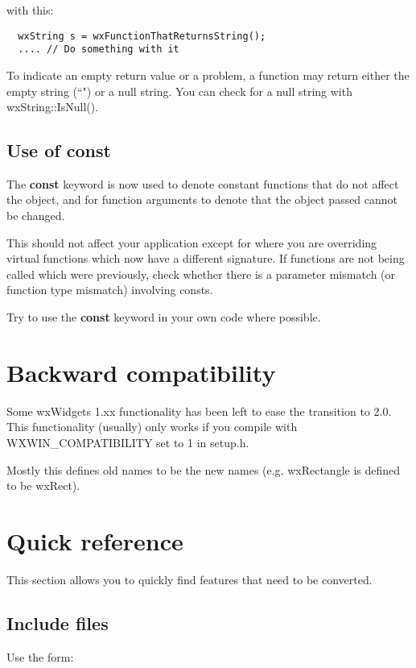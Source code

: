 with this:

{\small
\begin{verbatim}
  wxString s = wxFunctionThatReturnsString();
  .... // Do something with it
\end{verbatim}
}

To indicate an empty return value or a problem, a function may return either the
empty string (``") or a null string. You can check for a null string with wxString::IsNull().

\subsection{Use of const}

The {\bf const} keyword is now used to denote constant functions that do not affect the
object, and for function arguments to denote that the object passed cannot be changed.

This should not affect your application except for where you are overriding virtual functions
which now have a different signature. If functions are not being called which were previously,
check whether there is a parameter mismatch (or function type mismatch) involving consts.

Try to use the {\bf const} keyword in your own code where possible.

\section{Backward compatibility}\label{portingcompat}

Some wxWidgets 1.xx functionality has been left to ease the transition to 2.0. This functionality
(usually) only works if you compile with WXWIN\_COMPATIBILITY set to 1 in setup.h.

Mostly this defines old names to be the new names (e.g. wxRectangle is defined to be wxRect).

\section{Quick reference}\label{portingquickreference}

This section allows you to quickly find features that
need to be converted.

\subsection{Include files}

Use the form:

